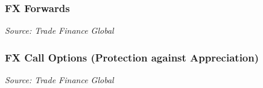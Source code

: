 \documentclass{beamer}
\begin{document}
\begin{frame}
\frametitle{FX Forwards}
\medskip
\emph{Source: Trade Finance Global \href{https://www.tradefinanceglobal.com/currency/forward-contracts/)}{}}
\end{frame}


\begin{frame}
  \frametitle{FX Call Options (Protection against Appreciation)}
  \emph{Source: Trade Finance Global \href{https://www.tradefinanceglobal.com/currency/foreign-exchange-options/)}{}}
\end{frame}
\end{document}
